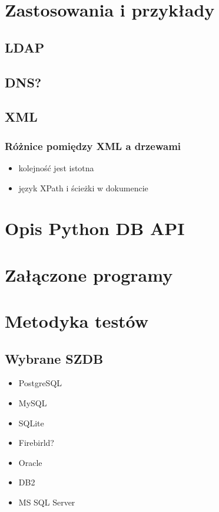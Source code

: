 \documentclass[12pt,a4paper,intlimits,oneside]{report}
\begin{document}
\chapter{Zastosowania i przykłady}

\section{LDAP}
\section{DNS?}
\section{XML}
\subsection{Różnice pomiędzy XML a drzewami}
\begin{itemize}
 \item kolejność jest istotna
 \item język XPath i ścieżki w dokumencie
\end{itemize}

\appendix

\chapter{Opis Python DB API}

\chapter{Załączone programy}

\chapter{Metodyka testów}
\section{Wybrane SZDB}
\begin{itemize}
 \item PostgreSQL
 \item MySQL
 \item SQLite
 \item Firebirld?
 \item Oracle
 \item DB2
 \item MS SQL Server
\end{itemize}
\end{document}
